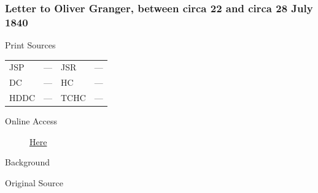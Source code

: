 		\subsubsection{Letter to Oliver Granger, between circa 22 and circa 28 July 1840}
			\label{EMS-1840-JS-CIR-22-CIR-28-JUL-1840}
			
			\begin{description}
				\item[Print Sources]
			\end{description}

			\begin{tabular}{p{0.5in}p{1in}p{0.5in}p{1in}}
				JSP	 	& ---		& JSR 		& --- \\
				DC	 	& ---		& HC 		& --- \\
				HDDC 	& ---		& TCHC 		& --- \\
			\end{tabular}
			
			\begin{description}
				\item[Online Access] \href{https://www.josephsmithpapers.org/paper-summary/letter-to-oliver-granger-between-circa-22-and-circa-28-july-1840/1}{Here}
			\end{description}
			
			\begin{description}
				\item[Background]
			\end{description}
			
			
			\begin{description}
				\item[Original Source]
			\end{description}
			
			
